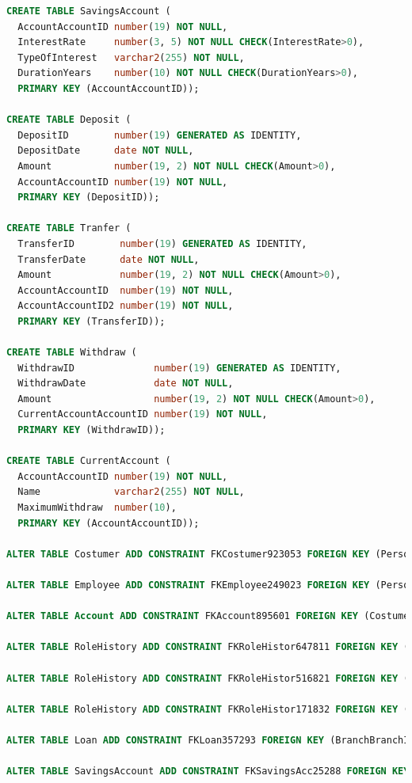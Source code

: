 \documentclass[a4paper, 10pt]{article}
\begin{document}
\begin{lstlisting}[language=SQL]
CREATE TABLE SavingsAccount (
  AccountAccountID number(19) NOT NULL, 
  InterestRate     number(3, 5) NOT NULL CHECK(InterestRate>0), 
  TypeOfInterest   varchar2(255) NOT NULL, 
  DurationYears    number(10) NOT NULL CHECK(DurationYears>0), 
  PRIMARY KEY (AccountAccountID));

CREATE TABLE Deposit (
  DepositID        number(19) GENERATED AS IDENTITY, 
  DepositDate      date NOT NULL, 
  Amount           number(19, 2) NOT NULL CHECK(Amount>0), 
  AccountAccountID number(19) NOT NULL, 
  PRIMARY KEY (DepositID));

CREATE TABLE Tranfer (
  TransferID        number(19) GENERATED AS IDENTITY, 
  TransferDate      date NOT NULL, 
  Amount            number(19, 2) NOT NULL CHECK(Amount>0), 
  AccountAccountID  number(19) NOT NULL, 
  AccountAccountID2 number(19) NOT NULL, 
  PRIMARY KEY (TransferID));

CREATE TABLE Withdraw (
  WithdrawID              number(19) GENERATED AS IDENTITY, 
  WithdrawDate            date NOT NULL, 
  Amount                  number(19, 2) NOT NULL CHECK(Amount>0), 
  CurrentAccountAccountID number(19) NOT NULL, 
  PRIMARY KEY (WithdrawID));

CREATE TABLE CurrentAccount (
  AccountAccountID number(19) NOT NULL, 
  Name             varchar2(255) NOT NULL, 
  MaximumWithdraw  number(10), 
  PRIMARY KEY (AccountAccountID));

ALTER TABLE Costumer ADD CONSTRAINT FKCostumer923053 FOREIGN KEY (PersonGovID) REFERENCES Person (GovID);

ALTER TABLE Employee ADD CONSTRAINT FKEmployee249023 FOREIGN KEY (PersonGovID) REFERENCES Person (GovID);

ALTER TABLE Account ADD CONSTRAINT FKAccount895601 FOREIGN KEY (CostumerCostumerID) REFERENCES Costumer (CostumerID);

ALTER TABLE RoleHistory ADD CONSTRAINT FKRoleHistor647811 FOREIGN KEY (RoleRoleID) REFERENCES Role (RoleID);

ALTER TABLE RoleHistory ADD CONSTRAINT FKRoleHistor516821 FOREIGN KEY (EmployeeEmployeeID) REFERENCES Employee (EmployeeID);

ALTER TABLE RoleHistory ADD CONSTRAINT FKRoleHistor171832 FOREIGN KEY (BranchBranchId) REFERENCES Branch (BranchId);

ALTER TABLE Loan ADD CONSTRAINT FKLoan357293 FOREIGN KEY (BranchBranchId) REFERENCES Branch (BranchId);

ALTER TABLE SavingsAccount ADD CONSTRAINT FKSavingsAcc25288 FOREIGN KEY (AccountAccountID) REFERENCES Account (AccountID);


\end{lstlisting}
\end{document}
